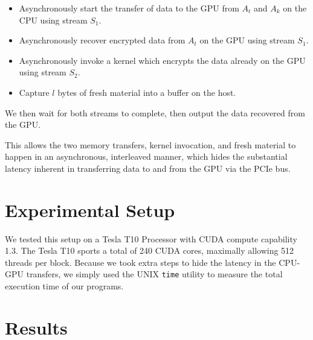 \documentclass[twocolumn]{article}
\begin{document}
  \begin{itemize}
    \item Asynchronously start the transfer of data to the GPU from $A_t$ and $A_k$ on the CPU using stream $S_1$.
    \item Asynchronously recover encrypted data from $A_t$ on the GPU using stream $S_1$.
    \item Asynchronously invoke a kernel which encrypts the data already on the GPU using stream $S_2$.
    \item Capture $l$ bytes of fresh material into a buffer on the host.
  \end{itemize}
  
  We then wait for both streams to complete, then output the data recovered from the GPU.
  
  This allows the two memory transfers, kernel invocation, and fresh material to happen in an asynchronous, interleaved manner, which hides the substantial latency inherent in transferring data to and from the GPU via the PCIe bus.

  
  \section{Experimental Setup}
  
  We tested this setup on a Tesla T10 Processor with CUDA compute capability 1.3. The Tesla T10 sports a total of 240 CUDA cores, maximally allowing 512 threads per block. Because we took extra steps to hide the latency in the CPU-GPU transfers, we simply used the UNIX \texttt{time} utility to measure the total execution time of our programs.
  
  \section{Results}
  

  
\end{document}
